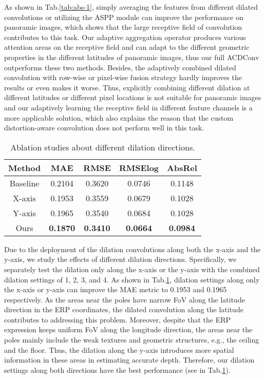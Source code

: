\documentclass[letterpaper]{article} \usepackage{aaai21}  \usepackage{times}  \usepackage{helvet} \usepackage{courier}  \usepackage[hyphens]{url}  \usepackage{graphicx} \urlstyle{rm} \def\UrlFont{\rm}  \usepackage{natbib}  \usepackage{caption} \frenchspacing  \setlength{\pdfpagewidth}{8.5in}  \setlength{\pdfpageheight}{11in}
\newcommand{\newchange}[1]{{\color{black}#1}}
\begin{document}
As shown in Tab.\ref{tab:abs-1}, simply averaging the features from different dilated convolutions or utilizing the ASPP module can improve the performance on panoramic images, which shows that the large receptive field of convolution contributes to this task. 
Our adaptive aggregation operator produces various attention areas on the receptive field and can adapt to the different geometric properties in the different latitudes of panoramic images, thus our full ACDConv outperforms these two methods.
\newchange{
Besides, the adaptively combined dilated convolution with row-wise or pixel-wise fusion strategy hardly improves the results or even makes it worse. 
Thus, explicitly combining different dilation at different latitudes or different pixel locations is not suitable for panoramic images and our adaptively learning the receptive field in different feature channels is a more applicable solution, which also explains the reason that the custom distortion-aware convolution does not perform well in this task.
}

\begin{table}[tb]
    \centering
\begin{tabular}{ccccc} 
\toprule 
Method & MAE & RMSE & RMSElog &  AbsRel \\
\midrule 
Baseline  & 0.2104 & 0.3620 & 0.0746 & 0.1148 \\
X-axis & 0.1953 & 0.3559 & 0.0679 & 0.1028 \\
Y-axis & 0.1965 & 0.3540 & 0.0684 & 0.1028 \\
Ours   & \textbf{0.1870} & \textbf{0.3410} & \textbf{0.0664} & \textbf{0.0984} \\
\bottomrule
    \end{tabular}
    \caption{Ablation studies about different dilation directions.}
    \label{tab:abs-2}
\end{table}

Due to the deployment of the dilation convolutions along both the x-axis and the y-axis, we study the effects of different dilation directions. 
Specifically, we separately test the dilation only along the x-axis or the y-axis with the combined dilation settings of 1, 2, 3, and 4. 
As shown in Tab.\ref{tab:abs-2}, dilation settings along only the x-axis or y-axis can improve the MAE metric to 0.1953 and 0.1965 respectively. 
As the areas near the poles have narrow FoV along the latitude direction in the ERP coordinates, the dilated convolution along the latitude contributes to addressing this problem. 
Moreover, despite that the ERP expression keeps uniform FoV along the longitude direction, the areas near the poles mainly include the weak textures and geometric structures, e.g., the ceiling and the floor. Thus, the dilation along the y-axis introduces more spatial information in these areas in estimating accurate depth. 
Therefore, our dilation settings along both directions have the best performance (see in Tab.\ref{tab:abs-2}).
\end{document}
